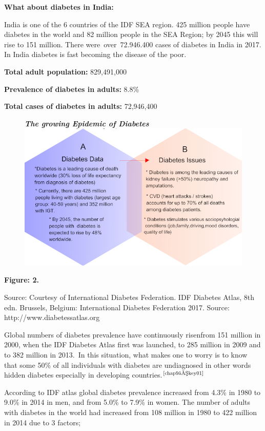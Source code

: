 \noindent\textbf{What about diabetes in India:}

India is one of the 6 countries of the IDF SEA region. 425 million people have diabetes in the world and 82 million people in the SEA Region; by 2045 this will rise to 151 million. There were over 72.946.400 cases of diabetes in India in 2017. In India diabetes is fast becoming the disease of the poor.

\noindent\textbf{Total adult population:} 829,491,000

\noindent\textbf{Prevalence of diabetes in adults:} 8.8\%

\noindent\textbf{Total cases of diabetes in adults:} 72,946,400

\begin{figure}[h]
\centering
\textbf{\textit{The growing Epidemic of Diabetes}}
\includegraphics[scale=2.6]{images/035.jpg}
\end{figure}

\noindent\textbf{Figure: 2.}

Source: Courtesy of International Diabe\-tes Federation. IDF Diabetes Atlas, 8th edn. Brussels, Belgium: International Diabetes Fede\-ration 2017. Source: http://www.diabetessatlas.org

Global numbers of diabetes prevalence have continuously risen\break from 151 million in 2000, when the IDF Diabetes Atlas first was laun\-ched, to 285 million in 2009 and to 382 million in 2013. In this situation, what makes one to worry is to know that some 50\% of all individuals with diabetes are undiagnosed in other words hidden diabetes especially in developing countries.$^{\text{\cite{chap9–key01}}}$

According to IDF atlas global diabetes prevalence increased from 4.3\% in 1980 to 9.0\% in 2014 in men, and from 5.0\% to 7.9\% in women. The number of adults with diabetes in the world had increased from 108 million in 1980 to 422 million in 2014 due to 3 factors;

